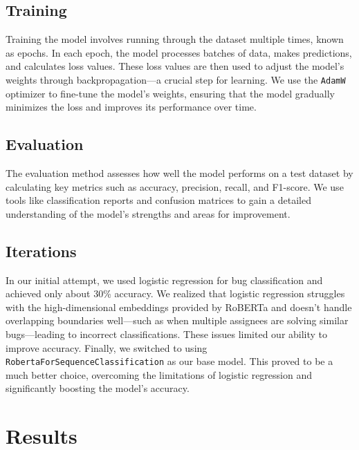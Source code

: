 \documentclass[tikz,10pt,fleqn]{article}
\begin{document}
\subsection{Training} Training the model involves running through the dataset multiple times, known as epochs. In each epoch, the model processes batches of data, makes predictions, and calculates loss values. These loss values are then used to adjust the model's weights through backpropagation—a crucial step for learning. We use the \texttt{AdamW} optimizer to fine-tune the model's weights, ensuring that the model gradually minimizes the loss and improves its performance over time.

\subsection{Evaluation} The evaluation method assesses how well the model performs on a test dataset by calculating key metrics such as accuracy, precision, recall, and F1-score. We use tools like classification reports and confusion matrices to gain a detailed understanding of the model's strengths and areas for improvement.

\subsection{Iterations} In our initial attempt, we used logistic regression for bug classification and achieved only about 30\% accuracy. We realized that logistic regression struggles with the high-dimensional embeddings provided by RoBERTa and doesn't handle overlapping boundaries well—such as when multiple assignees are solving similar bugs—leading to incorrect classifications. These issues limited our ability to improve accuracy. Finally, we switched to using \texttt{RobertaForSequenceClassification} as our base model. This proved to be a much better choice, overcoming the limitations of logistic regression and significantly boosting the model's accuracy.

\section*{Results}
\end{document}
